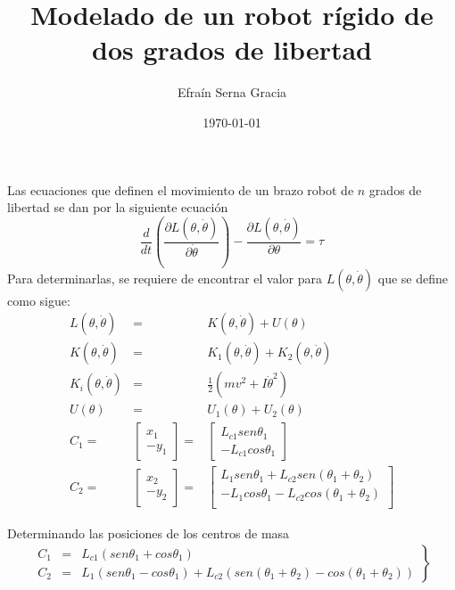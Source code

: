 \documentclass[11pt,spanish,lettersize]{article}
\title{\color{Maroon}Modelado de un robot r\'igido de dos grados de libertad}
\author{Efra\'in Serna Gracia}
\date{\color{gray}\today}
\begin{document}
\maketitle
Las ecuaciones que definen el movimiento de un brazo robot de $n$ grados de libertad se dan por la siguiente ecuaci\'on
\begin{equation}\label{dLagrangiano}
\frac{d}{dt}\left(\frac{\partial L(\theta,\dot{\theta})}{\partial\dot{\theta}}\right)-\frac{\partial L(\theta,\dot{\theta})}{\partial\theta}=\tau
\end{equation}
Para determinarlas, se requiere de encontrar el valor para $L(\theta,\dot{\theta})$ que se define como sigue:
\begin{eqnarray}
L(\theta,\dot{\theta})&=&K(\theta,\dot{\theta})+U(\theta)\label{Completa}\\
K(\theta,\dot{\theta})&=&K_1(\theta,\dot{\theta})+K_2(\theta,\dot{\theta})\\
K_i(\theta,\dot{\theta})&=&\frac{1}{2}(mv^2+I\dot{\theta}^2)\label{Cinetica}\\
U(\theta)&=&U_1(\theta)+U_2(\theta)\label{Potencial}\\
C_1=&\left[\begin{array}{c}
x_1\\
-y_1
\end{array}\right]=&\left[\begin{array}{c}
L_{c1}sen\theta_1\\
-L_{c1}cos\theta_1
\end{array}\right]\\
C_2=&\left[\begin{array}{c}
x_2\\
-y_2
\end{array}\right]=&\left[\begin{array}{c}
L_1sen\theta_1+L_{c2}sen(\theta_1+\theta_2)\\
-L_1cos\theta_1-L_{c2}cos(\theta_1+\theta_2)\\
\end{array}\right]
\end{eqnarray}

Determinando las posiciones de los centros de masa
\begin{eqnarray}
\left.\begin{array}{rcl}
C_1&=&L_{c1}(sen\theta_1+cos\theta_1)\\
C_2&=&L_1(sen\theta_1-cos\theta_1)+L_{c2}(sen(\theta_1+\theta_2)-cos(\theta_1+\theta_2))
\end{array}\right\}
\end{eqnarray}
\end{document}
